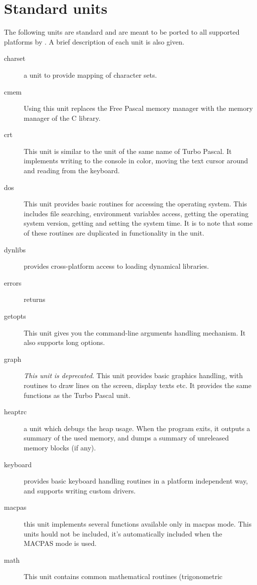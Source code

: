 %
%
\section{Standard units}

The following units are standard and are meant to be ported to
all supported platforms by \fpc. A brief description of each unit
is also given.

\begin{description}
\item[charset] a unit to provide mapping of character sets.
\item[cmem] Using this unit replaces the Free Pascal memory manager with the 
memory manager of the C library.
\item[crt] This unit is similar to the unit of the same name of
Turbo Pascal. It implements writing to the console in color,  moving the 
text cursor around and reading from the keyboard.
\item[dos] This unit provides basic routines for accessing the operating
system. This includes file searching, environment variables access,
getting the operating system version, getting and setting the
system time. It is to note that some of these routines are duplicated
in functionality in the  unit.
\item[dynlibs] provides cross-platform access to loading dynamical libraries.
\item[errors] returns 
\item[getopts] This unit gives you the \gnu {} command-line
arguments  handling mechanism. It also supports long options.
\item[graph] \emph{This unit is deprecated}. This unit provides basic graphics handling, with routines to
draw lines on the screen, display texts etc. It provides the same functions
as the Turbo Pascal unit. 
\item[heaptrc] a unit which debugs the heap usage. When the program exits, it outputs a summary of the used memory, and dumps a summary of unreleased memory blocks (if any).
\item[keyboard] provides basic keyboard handling routines in a platform independent way,
and supports writing custom drivers.
\item[macpas] this unit implements several functions available only in macpas mode. This units hould not be included, it's automatically included when the MACPAS mode is used.
\item[math] This unit contains common mathematical routines (trigonometric

\end{description}
